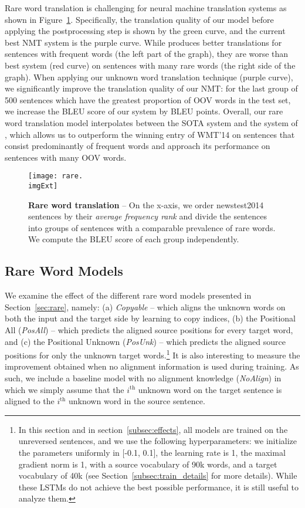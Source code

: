 \documentclass[11pt]{article}
\begin{document}
Rare word translation is challenging for neural machine translation systems as
shown in Figure~\ref{f:rare}. Specifically, the translation quality of our
model before applying the postprocessing step is shown by the green curve, and the current
best NMT system \cite{sutskever14} is the purple curve. While \cite{sutskever14}
produces better translations for sentences with frequent words (the left part of the
graph), they are worse than best system (red curve)
on sentences with many rare words (the right side of the graph). When applying our
unknown word translation technique (purple curve), we
significantly improve the translation quality of our NMT: 
for the last group of 500 sentences which have the greatest proportion of 
OOV words in the test set, we increase the BLEU score of our system by 
\imprare{} BLEU points. Overall, our rare word translation model 
interpolates between the SOTA system and the system
of ,  which allows us to outperform the winning entry of WMT'14
on sentences that consist predominantly of frequent words and approach its performance on sentences
with many OOV words.
\begin{figure}
\centering
\texttt{[image: rare.\\imgExt]} \caption{{\bf Rare word translation} -- 
On the x-axis, we order newstest2014 sentences by their {\it average frequency rank} and divide the sentences into groups 
of sentences with a comparable prevalence of rare words. 
We compute the BLEU score of each group independently.} 
\label{f:rare}
\end{figure}


\subsection{Rare Word Models}
\label{subsec:rare_model_compare}

We examine the effect of the different rare word models presented in
Section~\ref{sec:rare}, namely: (a) {\it Copyable} -- which aligns the unknown
words on both the input and the target side by learning to copy indices, (b) the Positional All
({\it PosAll}) -- which predicts the aligned source positions for every target
word, and (c) the Positional Unknown ({\it PosUnk}) -- which predicts the aligned
source positions for only the unknown target words.\footnote{In this section and in section~\ref{subsec:effects},
all models are trained on the unreversed sentences, and we use the following hyperparameters: 
we initialize the parameters uniformly in [-0.1, 0.1], the learning rate is 1, the maximal gradient norm is 1, 
with a source vocabulary of 90k words, and a target vocabulary of 40k (see Section~\ref{subsec:train_details} for more details).
While these LSTMs do not achieve the best possible performance, it is still useful to analyze them.}
It is also interesting to measure the improvement obtained when no alignment information is used during training.
As such, we include a baseline model with no alignment knowledge ({\it NoAlign}) in which we simply assume that the $i^{\textrm{th}}$ unknown word on the target
sentence is aligned to the $i^{\textrm{th}}$ unknown word in the source sentence.
\end{document}
